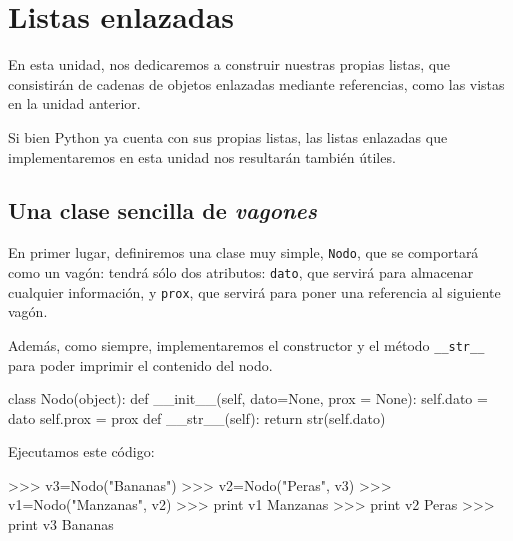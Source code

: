 
%

\chapter{Listas enlazadas}

En esta unidad, nos dedicaremos a construir nuestras propias listas, que
consistirán de cadenas de objetos enlazadas mediante referencias, como las
vistas en la unidad anterior.

Si bien Python ya cuenta con sus propias listas, las listas enlazadas que
implementaremos en esta unidad nos resultarán también útiles.  

\section{Una clase sencilla de {\it vagones}}

En primer lugar, definiremos una clase muy simple, \lstinline!Nodo!, que se
comportará como un vagón: tendrá sólo dos atributos: \lstinline!dato!, que
servirá para almacenar cualquier información, y \lstinline!prox!, que servirá
para poner una referencia al siguiente vagón.

Además, como siempre, implementaremos el constructor y el método
\lstinline!__str__! para poder imprimir el contenido del nodo.

\begin{codigo-python-sn}
class Nodo(object):
    def __init__(self, dato=None, prox = None):
        self.dato = dato
        self.prox = prox
    def __str__(self):
        return str(self.dato)
\end{codigo-python-sn}

Ejecutamos este código:

\begin{codigo-python-sn}
>>> v3=Nodo("Bananas")
>>> v2=Nodo("Peras", v3)
>>> v1=Nodo("Manzanas", v2)
>>> print v1
Manzanas
>>> print v2
Peras
>>> print v3
Bananas
\end{codigo-python-sn}


